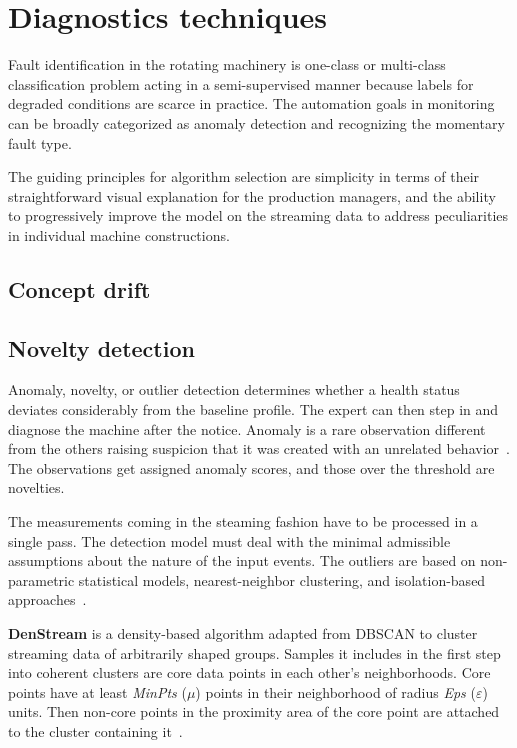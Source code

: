\section{Diagnostics techniques} \label{section:diagnostics-techniques}
Fault identification in the rotating machinery is one-class or multi-class classification problem acting in a semi-supervised manner because labels for degraded conditions are scarce in practice. The automation goals in monitoring can be broadly categorized as anomaly detection and recognizing the momentary fault type.

The guiding principles for algorithm selection are simplicity in terms of their straightforward visual explanation for the production managers, and the ability to progressively improve the model on the streaming data to address peculiarities in individual machine constructions.

\subsection{Concept drift}

\subsection{Novelty detection}
Anomaly, novelty, or outlier detection determines whether a health status deviates considerably from the baseline profile. The expert can then step in and diagnose the machine after the notice. Anomaly is a rare observation different from the others raising suspicion that it was created with an unrelated behavior~\cite{aggarwal_outlier_2016}. The observations get assigned anomaly scores, and those over the threshold are novelties.

The measurements coming in the steaming fashion have to be processed in a single pass. The detection model must deal with the minimal admissible assumptions about the nature of the input events. The outliers are based on non-parametric statistical models, nearest-neighbor clustering, and isolation-based approaches~\cite{gervasi_anomaly_2020}.
\bigbreak

\textbf{DenStream} is a density-based algorithm adapted from DBSCAN to cluster streaming data of arbitrarily shaped groups. Samples it includes in the first step into coherent clusters are core data points in each other's neighborhoods. Core points have at least \emph{MinPts} ($\mu$) points in their neighborhood of radius \emph{Eps} ($\varepsilon$) units. Then non-core points in the proximity area of the core point are attached to the cluster containing it~\cite{aggarwal_data_2014}.

